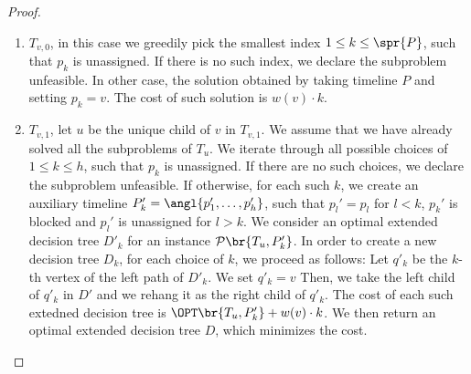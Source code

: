 \begin{theorem}
\begin{proof}
    \begin{enumerate}
        \item $T_{v,0}$, in this case we greedily pick the smallest index $1 \leq k \leq \spr{P}$, such that $p_k$ is unassigned. If there is no such index, we declare the subproblem unfeasible. In other case, the solution obtained by taking timeline $P$ and setting $p_k=v$. The cost of such solution is $w(v)\cdot k$.
        \item $T_{v,1}$, let $u$ be the unique child of $v$ in $T_{v,1}$. We assume that we have already solved all the subproblems of $T_u$.
        We iterate through all possible choices of $1\leq k \leq h$, such that $p_k$ is unassigned. If there are no such choices, we declare the subproblem unfeasible. If otherwise, for each such $k$, we create an auxiliary timeline $P_k'=
        \angl{p_1',\dots,p_h'}$, such that $p_l'=p_l$ for $l < k$, $p_k'$ is blocked and $p_l'$ is unassigned for $l>k$. We consider an optimal extended decision tree $D'_k$ for an instance $\mathcal{P}\br{T_{u}, P_k'}$. In order to create a new decision tree $D_k$, for each choice of $k$, we proceed as follows: Let $q'_k$ be the $k$-th vertex of the left path of $D'_k$. We set $q'_k=v$ Then, we take the left child of $q'_k$ in $D'$ and we rehang it as the right child of $q'_k$.
        The cost of each such extedned decision tree is $\OPT\br{T_{u}, P_k'}+w(v)\cdot k$. We then return an optimal extended decision tree $D$, which minimizes the cost.

\end{enumerate}
\end{proof}
\end{theorem}
